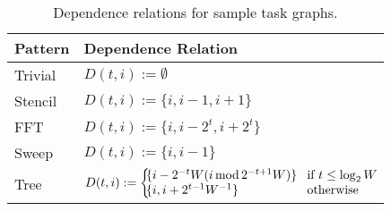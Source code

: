 \begin{table}[t]
\small
\begin{tabular}{l | l}
Pattern & Dependence Relation \\
\hline


Trivial & $D(t, i) := \emptyset$ \\
Stencil & $D(t, i) := \{ i, i - 1, i + 1 \}$ \\
FFT & $D(t, i) := \{ i, i - 2^t, i + 2^t \}$ \\
Sweep & $D(t, i) := \{ i, i - 1 \}$ \\
Tree & $D(t, i) := \left\{ \!\!\!\! \arraycolsep=4pt\begin{array}{l l} \{ i - 2^{-t}W(i \operatorname{mod} 2^{-t + 1}W) \} & \text{if } t \le \operatorname{log}_2 W \\ \{ i, i + 2^{t-1}W^{-1} \} & \text{otherwise} \end{array} \right. \!\!\!\! $ \\
\end{tabular}

\caption{Dependence relations for sample task graphs.\label{tab:equations}}
\vspace{-0.5cm}
\end{table}
